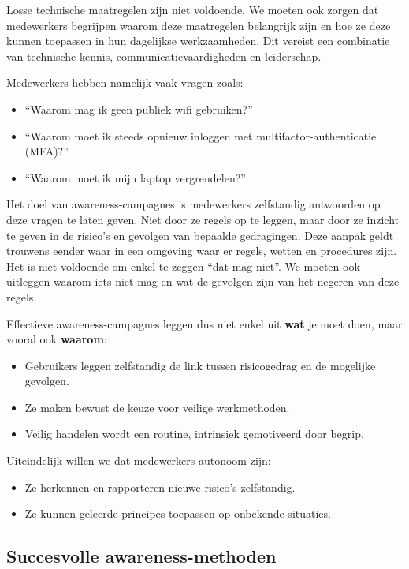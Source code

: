 \documentclass[
  10pt,
  dutch,
  paper=a4,
  ,captions=tableheading
]{scrbook}
\providecommand{\tightlist}{%
  \setlength{\itemsep}{0pt}\setlength{\parskip}{0pt}}
\begin{document}
Losse technische maatregelen zijn niet voldoende. We moeten ook zorgen
dat medewerkers begrijpen waarom deze maatregelen belangrijk zijn en hoe
ze deze kunnen toepassen in hun dagelijkse werkzaamheden. Dit vereist
een combinatie van technische kennis, communicatievaardigheden en
leiderschap.

Medewerkers hebben namelijk vaak vragen zoals:

\begin{itemize}
\tightlist
\item
  ``Waarom mag ik geen publiek wifi gebruiken?''
\item
  ``Waarom moet ik steeds opnieuw inloggen met multifactor-authenticatie
  (MFA)?''
\item
  ``Waarom moet ik mijn laptop vergrendelen?''
\end{itemize}

Het doel van awareness-campagnes is medewerkers zelfstandig antwoorden
op deze vragen te laten geven. Niet door ze regels op te leggen, maar
door ze inzicht te geven in de risico's en gevolgen van bepaalde
gedragingen. Deze aanpak geldt trouwens eender waar in een omgeving waar
er regels, wetten en procedures zijn. Het is niet voldoende om enkel te
zeggen ``dat mag niet''. We moeten ook uitleggen waarom iets niet mag en
wat de gevolgen zijn van het negeren van deze regels.

Effectieve awareness-campagnes leggen dus niet enkel uit \textbf{wat} je
moet doen, maar vooral ook \textbf{waarom}:

\begin{itemize}
\tightlist
\item
  Gebruikers leggen zelfstandig de link tussen risicogedrag en de
  mogelijke gevolgen.
\item
  Ze maken bewust de keuze voor veilige werkmethoden.
\item
  Veilig handelen wordt een routine, intrinsiek gemotiveerd door begrip.
\end{itemize}

Uiteindelijk willen we dat medewerkers autonoom zijn:

\begin{itemize}
\tightlist
\item
  Ze herkennen en rapporteren nieuwe risico's zelfstandig.
\item
  Ze kunnen geleerde principes toepassen op onbekende situaties.
\end{itemize}

\subsection{Succesvolle
awareness-methoden}\label{succesvolle-awareness-methoden}
\end{document}
